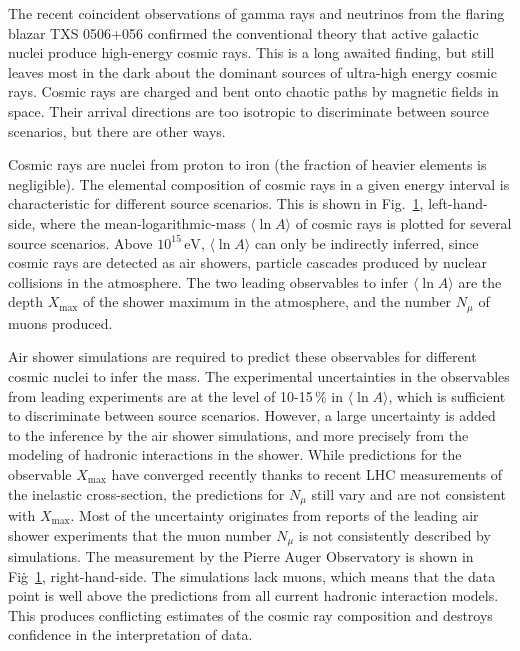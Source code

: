 \documentclass[../report.tex]{subfiles}
\newcommand{\mlna}{\langle \ln\!A \rangle}
\newcommand{\nmu}{N_\mu}
\newcommand{\xmax}{X_\text{max}}
\newcommand{\si}[1]{\ensuremath{\text{#1}}}
\begin{document}
\begin{figure}
\label{fig:cosmic_rays}
\end{figure}

The recent coincident observations of gamma rays and neutrinos from the flaring blazar TXS 0506+056 confirmed the conventional theory that active galactic nuclei produce high-energy cosmic rays\cite{IceCube:2018dnn}. This is a long awaited finding, but still leaves most in the dark about the dominant sources of ultra-high energy cosmic rays. Cosmic rays are charged and bent onto chaotic paths by magnetic fields in space. Their arrival directions are too isotropic to discriminate between source scenarios, but there are other ways.

Cosmic rays are nuclei from proton to iron (the fraction of heavier elements is negligible). The elemental composition of cosmic rays in a given energy interval is characteristic for different source scenarios. This is shown in Fig.~\ref{fig:cosmic_rays}, left-hand-side, where the mean-logarithmic-mass $\mlna$ of cosmic rays is plotted for several source scenarios. Above $10^{15}$\,\si{eV}, $\mlna$ can only be indirectly inferred, since cosmic rays are detected as air showers, particle cascades produced by nuclear collisions in the atmosphere. The two leading observables to infer $\mlna$ are the depth $\xmax$ of the shower maximum in the atmosphere, and the number $\nmu$ of muons produced.

Air shower simulations are required to predict these observables for different cosmic nuclei to infer the mass. The experimental uncertainties in the observables from leading experiments are at the level of 10-15\,\% in $\mlna$, which is sufficient to discriminate between source scenarios. However, a large uncertainty is added to the inference by the air shower simulations, and more precisely from the modeling of hadronic interactions in the shower. While predictions for the observable $\xmax$ have converged recently thanks to recent LHC measurements of the inelastic cross-section, the predictions for $\nmu$ still vary and are not consistent with $\xmax$. Most of the uncertainty originates from reports of the leading air shower experiments\cite{Aab:2014pza,Dembinski:2017zkb,Kokoulin:2009zz,AbuZayyad:1999xa,Aab:2014dua} that the muon number $\nmu$ is not consistently described by simulations. The measurement by the Pierre Auger Observatory is shown in Fig\.~\ref{fig:cosmic_rays}, right-hand-side. The simulations lack muons, which means that the data point is well above the predictions from all current hadronic interaction models. This produces conflicting estimates of the cosmic ray composition and destroys confidence in the interpretation of data.
\end{document}
